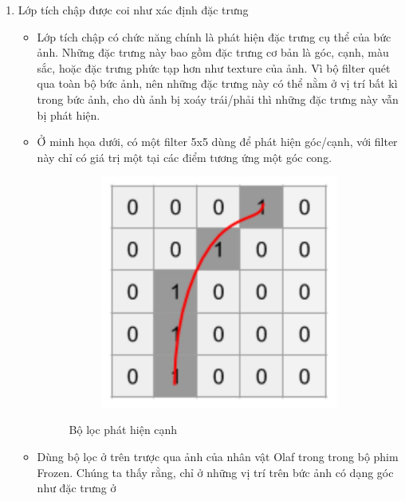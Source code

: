 \begin{enumerate}
    \item Lớp tích chập được coi như xác định đặc trưng
          \begin{itemize}
              \item Lớp tích chập có chức năng chính là phát hiện đặc trưng cụ thể của bức ảnh.
                    Những đặc trưng này bao gồm đặc trưng cơ bản là góc, cạnh, màu sắc, hoặc đặc trưng
                    phức tạp hơn như texture của ảnh. Vì bộ filter quét qua toàn bộ bức ảnh, nên những
                    đặc trưng này có thể nằm ở vị trí bất kì trong bức ảnh, cho dù ảnh bị xoáy trái/phải
                    thì những đặc trưng này vẫn bị phát hiện.
              \item Ở minh họa dưới, có một filter 5x5 dùng để phát hiện góc/cạnh, với filter này
                    chỉ có giá trị một tại các điểm tương ứng một góc cong.
                    \begin{figure}
                        \begin{subfigure}{0.6\textwidth}
                            \begin{center}
                                \includegraphics[width=0.6\linewidth]{Chapters/items/chap2_3.jpg}
                            \end{center}
                            \label{fig:chap2_3}
                        \end{subfigure}
                        \caption{Bộ lọc phát hiện cạnh}
                    \end{figure}
              \item Dùng bộ lọc ở trên trược qua ảnh của nhân vật Olaf trong trong bộ phim Frozen.
                    Chúng ta thấy rằng, chỉ ở những vị trí trên bức ảnh có dạng góc như đặc trưng ở

\end{itemize}
\end{enumerate}
